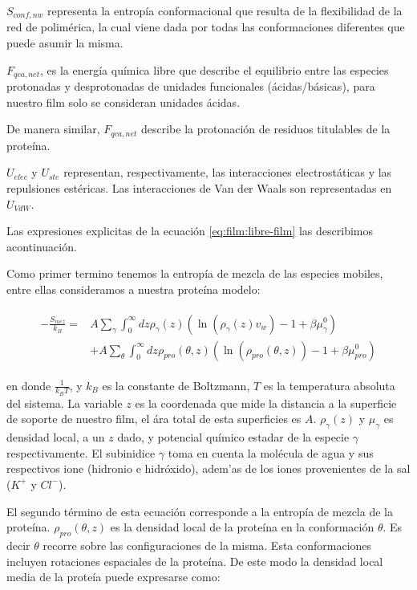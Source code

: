 $S_{conf,nw}$ representa la entrop\'ia conformacional que resulta de la flexibilidad de la red de polim\'erica, la cual viene dada por todas las conformaciones diferentes que puede asumir la misma.

$F_{qca,net}$, es la energ\'ia qu\'imica libre que describe el equilibrio entre las especies protonadas y desprotonadas de unidades funcionales (\'acidas/b\'asicas), para nuestro film solo se consideran unidades \'acidas.

De manera similar, $F_{qca,net}$ describe la protonaci\'on de residuos titulables de la prote\'ina.

$U_{elec}$ y $U_{ste}$ representan, respectivamente, las interacciones electrost\'aticas y las repulsiones est\'ericas.
Las interacciones de Van der Waals son representadas en $U_{VdW}$.


Las expresiones explicitas de la ecuaci\'on \ref{eq:film:libre-film} las describimos acontinuaci\'on.

Como primer termino tenemos la entrop\'ia de mezcla de  las especies mobiles, entre ellas consideramos a nuestra prote\'ina modelo:

\begin{align}
	\begin{aligned}
		-\frac{S_{mez}}{k_B}= &A\sum_{\gamma}\int_0^\infty{dz\rho_\gamma(z)\left(\ln \left(\rho_\gamma (z)v_w\right) -1 + \beta\mu^0_\gamma\right)} \\
		&+ A\sum_{\theta}\int_0^\infty{dz\rho_{pro}(\theta,z)\left(\ln \left(\rho_{pro}(\theta,z)\right) -1 + \beta\mu^0_{pro} \right)}
	\end{aligned}
\end{align}

\noindent en donde $\frac{1}{k_B T}$, y $k_B$ es la constante de Boltzmann, $T$ es la temperatura absoluta del sistema. La variable $z$ es la coordenada que mide la distancia a la superficie de soporte de nuestro film, el \'ara total de esta superficies es $A$. $\rho_\gamma(z)$ y $\mu_\gamma$ es densidad local, a un $z$ dado, y potencial qu\'imico estadar de la especie $\gamma$ respectivamente.
El subinidice $\gamma$ toma en cuenta la mol\'ecula de agua y sus respectivos ione (hidronio e hidr\'oxido), adem'as de los iones provenientes de la sal ($K^+$ y $Cl^-$). 


El segundo t\'ermino de esta ecuaci\'on corresponde a la entrop\'ia de mezcla de la prote\'ina. $\rho_{pro}(\theta,z)$ es la densidad local de la prote\'ina en la conformaci\'on $\theta$. Es decir $\theta$ recorre sobre las configuraciones de la misma.
Esta conformaciones incluyen rotaciones espaciales de la prote\'ina.
De este modo la densidad local media de la prote\'ia puede expresarse como:


